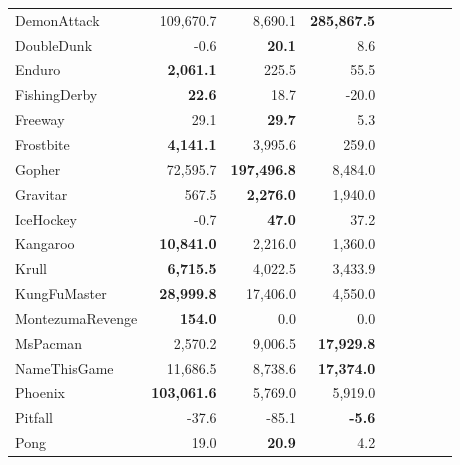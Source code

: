 \begin{table}[ht]
\begin{center}
\begin{small}
\begin{tabular}{lrrrrrrrl}
DemonAttack      & 109,670.7               & 8,690.1                 & \textbf{285,867.5}   \\
DoubleDunk       & -0.6                    & \textbf{20.1}           & 8.6                  \\
Enduro           & \textbf{2,061.1}        & 225.5                   & 55.5                 \\
FishingDerby     & \textbf{22.6}           & 18.7                    & -20.0                \\
Freeway          & 29.1                    & \textbf{29.7}           & 5.3                  \\
Frostbite        & \textbf{4,141.1}        & 3,995.6                 & 259.0                \\
Gopher           & 72,595.7                & \textbf{197,496.8}      & 8,484.0              \\
Gravitar         & 567.5                   & \textbf{2,276.0}        & 1,940.0              \\
IceHockey        & -0.7                    & \textbf{47.0}           & 37.2                 \\
Kangaroo         & \textbf{10,841.0}       & 2,216.0                 & 1,360.0              \\
Krull            & \textbf{6,715.5}        & 4,022.5                 & 3,433.9              \\
KungFuMaster     & \textbf{28,999.8}       & 17,406.0                & 4,550.0              \\
MontezumaRevenge & \textbf{154.0}          & 0.0                     & 0.0                  \\
MsPacman         & 2,570.2                 & 9,006.5                 & \textbf{17,929.8}    \\
NameThisGame     & 11,686.5                & 8,738.6                 & \textbf{17,374.0}    \\
Phoenix          & \textbf{103,061.6}      & 5,769.0                 & 5,919.0              \\
Pitfall          & -37.6                   & -85.1                   & \textbf{-5.6}        \\
Pong             & 19.0                    & \textbf{20.9}           & 4.2                  \\

\end{tabular}
\end{small}
\end{center}
\end{table}
